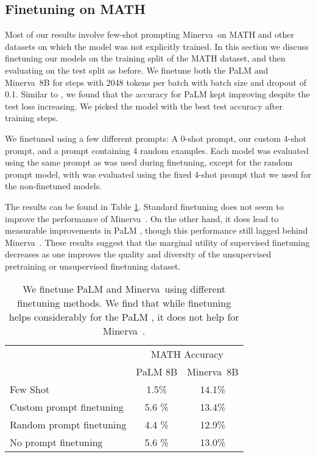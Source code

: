 \documentclass{article}
\newcommand{\ourmodel}[0]{{Minerva~}}
\newcommand{\pretrainedmodel}{{PaLM }}
\begin{document}
\subsection{Finetuning on MATH}
\label{appendix:finetuning}

Most of our results involve few-shot prompting \ourmodel on MATH and other datasets on which the model was not explicitly trained. In this section we discuss finetuning our models on the training split of the MATH dataset, and then evaluating on the test split as before. We finetune both the \pretrainedmodel and \ourmodel 8B for  steps with 2048 tokens per batch with batch size  and dropout of 0.1. Similar to \cite{alphacode}, we found that the accuracy for \pretrainedmodel kept improving despite the test loss increasing. We picked the model with the best test accuracy after  training steps.

We finetuned using a few different prompts: A 0-shot prompt, our custom 4-shot prompt, and a prompt containing 4 random examples. 
Each model was evaluated using the same prompt as was used during finetuning, except for the random prompt model, with was evaluated using the fixed 4-shot prompt that we used for the non-finetuned models. 

The results can be found in Table \ref{tbl:finetuning}. Standard finetuning does not seem to improve the performance of \ourmodel\!. On the other hand, it does lead to measurable improvements in \pretrainedmodel\!, though this performance still lagged behind \ourmodel\!. These results suggest that the marginal utility of supervised finetuning decreases as one improves the quality and diversity of the unsupervised pretraining or unsupervised finetuning dataset. 


\begin{table}[ht!]
\caption{We finetune \pretrainedmodel and \ourmodel using different finetuning methods. We find that while finetuning helps considerably for the \pretrainedmodel\!, it does not help for \ourmodel\!.}
\label{tbl:finetuning}
\begin{center}
\begin{tabular}{lcc}
\toprule
  &  \multicolumn{2}{c}{MATH Accuracy} \\
\cmidrule(r){2-3}
  &  \pretrainedmodel 8B & \ourmodel 8B    \\
\midrule
Few Shot & 1.5\% & 14.1\% \\
Custom prompt finetuning & 5.6 \% & 13.4\% \\
Random prompt finetuning & 4.4 \% & 12.9\% \\
No prompt finetuning  & 5.6 \% & 13.0\% \\
\bottomrule
\end{tabular}
\end{center}
\end{table}
\end{document}
